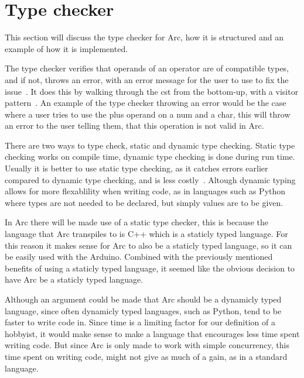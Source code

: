 \section{Type checker}\label{sec:typechecker}
This section will discuss the type checker for Arc, how it is structured and an example of how it is implemented.

The type checker verifies that operands of an operator are of compatible types, and if not, throws an error, with an error message for the user to use to fix the issue~\cite{Sebesta2016}. It does this by walking through the \gls{cst} from the bottom-up, with a visitor pattern~\cite{Parr2014}. An example of the type checker throwing an error would be the case where a user tries to use the plus operand on a num and a char, this will throw an error to the user telling them, that this operation is not valid in Arc.

There are two ways to type check, static and dynamic type checking. Static type checking works on compile time, dynamic type checking is done during run time. Usually it is better to use static type checking, as it catches errors earlier compared to dynamic type checking, and is less costly~\cite{Sebesta2016}. Altough dynamic typing allows for more flexablility when writing code, as in languages such as Python where types are not needed to be declared, but simply values are to be given.

In Arc there will be made use of a static type checker, this is because the language that Arc transpiles to is C++ which is a staticly typed language. For this reason it makes sense for Arc to also be a staticly typed language, so it can be easily used with the Arduino. Combined with the previously mentioned benefits of using a staticly typed language, it seemed like the obvious decision to have Arc be a staticly typed language.

Although an argument could be made that Arc should be a dynamicly typed language, since often dynamicly typed languages, such as Python, tend to be faster to write code in. Since time is a limiting factor for our definition of a hobbyist, it would make sense to make a language that encourages less time spent writing code. But since Arc is only made to work with simple concurrency, this time spent on writing code, might not give as much of a gain, as in a standard language. 


